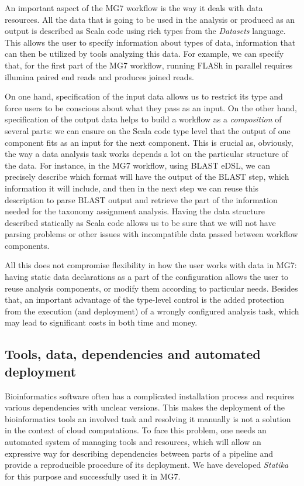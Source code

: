 \documentclass[fontsize=8pt,paper=a4,pagesize,abstracton]{scrartcl}
\begin{document}
An important aspect of the MG7 workflow is the way it deals with data
resources. All the data that is going to be used in the analysis or
produced as an output is described as Scala code using rich types from
the \emph{Datasets} language. This allows the user to specify
information about types of data, information that can then be utilized
by tools analyzing this data. For example, we can specify that, for the
first part of the MG7 workflow, running FLASh in parallel requires
illumina paired end reads and produces joined reads.

On one hand, specification of the input data allows us to restrict its
type and force users to be conscious about what they pass as an input.
On the other hand, specification of the output data helps to build a
workflow as a \emph{composition} of several parts: we can ensure on the
Scala code type level that the output of one component fits as an input
for the next component. This is crucial as, obviously, the way a data
analysis task works depends a lot on the particular structure of the
data. For instance, in the MG7 workflow, using BLAST eDSL, we can
precisely describe which format will have the output of the BLAST step,
which information it will include, and then in the next step we can
reuse this description to parse BLAST output and retrieve the part of
the information needed for the taxonomy assignment analysis. Having the
data structure described statically as Scala code allows us to be sure
that we will not have parsing problems or other issues with incompatible
data passed between workflow components.

All this does not compromise flexibility in how the user works with data
in MG7: having static data declarations as a part of the configuration
allows the user to reuse analysis components, or modify them according
to particular needs. Besides that, an important advantage of the
type-level control is the added protection from the execution (and
deployment) of a wrongly configured analysis task, which may lead to
significant costs in both time and money.

\subsection{Tools, data, dependencies and automated
deployment}\label{tools-data-dependencies-and-automated-deployment}

Bioinformatics software often has a complicated installation process and
requires various dependencies with unclear versions. This makes the
deployment of the bioinformatics tools an involved task and resolving it
manually is not a solution in the context of cloud computations. To face
this problem, one needs an automated system of managing tools and
resources, which will allow an expressive way for describing
dependencies between parts of a pipeline and provide a reproducible
procedure of its deployment. We have developed \emph{Statika} for this
purpose and successfully used it in MG7.
\end{document}
